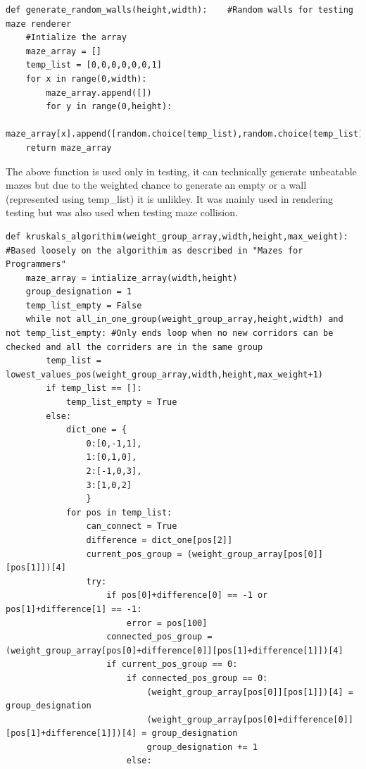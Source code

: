 \begin{lstlisting}
def generate_random_walls(height,width):    #Random walls for testing maze renderer
    #Intialize the array
    maze_array = []
    temp_list = [0,0,0,0,0,0,1]
    for x in range(0,width):
        maze_array.append([])
        for y in range(0,height):
            maze_array[x].append([random.choice(temp_list),random.choice(temp_list),random.choice(temp_list),random.choice(temp_list)])
    return maze_array
\end{lstlisting}
The above function is used only in testing, it can technically generate unbeatable mazes but due to the weighted chance to generate an empty or 
a wall (represented using temp\_list) it is unlikley. It  was mainly used in rendering testing but was also used when testing maze collision. 
\clearpage
\begin{lstlisting}
def kruskals_algorithim(weight_group_array,width,height,max_weight): #Based loosely on the algorithim as described in "Mazes for Programmers"
    maze_array = intialize_array(width,height)
    group_designation = 1                                                                                                                                           
    temp_list_empty = False
    while not all_in_one_group(weight_group_array,height,width) and not temp_list_empty: #Only ends loop when no new corridors can be checked and all the corriders are in the same group
        temp_list = lowest_values_pos(weight_group_array,width,height,max_weight+1)
        if temp_list == []:
            temp_list_empty = True
        else:
            dict_one = {
                0:[0,-1,1],
                1:[0,1,0],
                2:[-1,0,3],
                3:[1,0,2]
                }
            for pos in temp_list:
                can_connect = True
                difference = dict_one[pos[2]]
                current_pos_group = (weight_group_array[pos[0]][pos[1]])[4]                
                try:
                    if pos[0]+difference[0] == -1 or pos[1]+difference[1] == -1:
                        error = pos[100]
                    connected_pos_group = (weight_group_array[pos[0]+difference[0]][pos[1]+difference[1]])[4]
                    if current_pos_group == 0:
                        if connected_pos_group == 0:
                            (weight_group_array[pos[0]][pos[1]])[4] = group_designation
                            (weight_group_array[pos[0]+difference[0]][pos[1]+difference[1]])[4] = group_designation
                            group_designation += 1
                        else:

\end{lstlisting}
